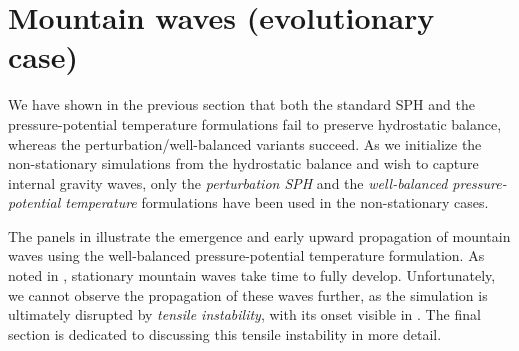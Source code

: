 \documentclass[../main.tex]{subfiles}
\begin{document}
\section{Mountain waves (evolutionary case)}
\label{sec:EVOLUTIONARY}

We have shown in the previous section that both the standard SPH and the pressure-potential temperature formulations fail to preserve hydrostatic balance, whereas the perturbation/well-balanced variants succeed. As we initialize the non-stationary simulations from the hydrostatic balance and wish to capture internal gravity waves, only the \emph{perturbation SPH} and the \emph{well-balanced pressure-potential temperature} formulations have been used in the non-stationary cases.

The panels in  illustrate the emergence and early upward propagation of mountain waves using the well-balanced pressure-potential temperature formulation. As noted in , stationary mountain waves take time to fully develop. Unfortunately, we cannot observe the propagation of these waves further, as the simulation is ultimately disrupted by \emph{tensile instability}, with its onset visible in . The final section is dedicated to discussing this tensile instability in more detail.
\end{document}
